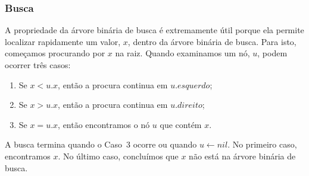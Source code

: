\documentclass{beamer}
\begin{document}
\begin{frame}
\frametitle{Busca}
A propriedade da árvore binária de busca é extremamente útil porque ela permite localizar rapidamente um valor, \ensuremath{\ensuremath{\ensuremath{\mathit{x}}}}, dentro da árvore binária de busca.  Para isto, começamos procurando por \ensuremath{\ensuremath{\ensuremath{\mathit{x}}}} na raiz. Quando examinamos um nó, \ensuremath{\ensuremath{\ensuremath{\mathit{u}}}}, podem ocorrer três casos:
\begin{enumerate}
\item Se $\ensuremath{\ensuremath{\ensuremath{\mathit{x}}}}< \ensuremath{\ensuremath{\ensuremath{\mathit{u}}.\ensuremath{\mathit{x}}}}$, então a procura continua em \ensuremath{\ensuremath{\ensuremath{\mathit{u}}.\ensuremath{\mathit{esquerdo}}}};
\item Se $\ensuremath{\ensuremath{\ensuremath{\mathit{x}}}}> \ensuremath{\ensuremath{\ensuremath{\mathit{u}}.\ensuremath{\mathit{x}}}}$, então a procura continua em \ensuremath{\ensuremath{\ensuremath{\mathit{u}}.\ensuremath{\mathit{direito}}}};
\item Se $\ensuremath{\ensuremath{\ensuremath{\mathit{x}}}}= \ensuremath{\ensuremath{\ensuremath{\mathit{u}}.\ensuremath{\mathit{x}}}}$, então encontramos o nó \ensuremath{\ensuremath{\ensuremath{\mathit{u}}}} que contém \ensuremath{\ensuremath{\ensuremath{\mathit{x}}}}.
\end{enumerate}
A busca termina quando o Caso~3 ocorre ou quando \ensuremath{\ensuremath{\ensuremath{\mathit{u}}\gets \ensuremath{nil}}}.  No primeiro caso, encontramos \ensuremath{\ensuremath{\ensuremath{\mathit{x}}}}.  No último caso, concluímos que \ensuremath{\ensuremath{\ensuremath{\mathit{x}}}}
não está na árvore binária de busca.
\end{frame}
\end{document}
